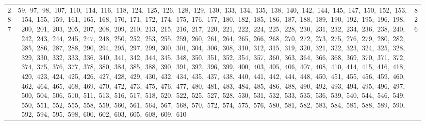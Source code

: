 \begin{longtable}{c|p{}|r}
287 & 59,\ 97,\ 98,\ 107,\ 110,\ 114,\ 116,\ 118,\ 124,\ 125,\ 126,\ 128,\ 129,\ 130,\ 133,\ 134,\ 135,\ 138,\ 140,\ 142,\ 144,\ 145,\ 147,\ 150,\ 152,\ 153,\ 154,\ 155,\ 159,\ 161,\ 165,\ 168,\ 170,\ 171,\ 172,\ 174,\ 175,\ 176,\ 177,\ 180,\ 182,\ 185,\ 186,\ 187,\ 188,\ 189,\ 190,\ 192,\ 195,\ 196,\ 198,\ 200,\ 201,\ 203,\ 205,\ 207,\ 208,\ 209,\ 210,\ 213,\ 215,\ 216,\ 217,\ 220,\ 221,\ 222,\ 224,\ 225,\ 228,\ 230,\ 231,\ 232,\ 234,\ 236,\ 238,\ 240,\ 242,\ 243,\ 244,\ 245,\ 247,\ 248,\ 250,\ 252,\ 253,\ 255,\ 259,\ 260,\ 261,\ 264,\ 265,\ 266,\ 268,\ 270,\ 272,\ 273,\ 275,\ 276,\ 279,\ 280,\ 282,\ 285,\ 286,\ 287,\ 288,\ 290,\ 294,\ 295,\ 297,\ 299,\ 300,\ 301,\ 304,\ 306,\ 308,\ 310,\ 312,\ 315,\ 319,\ 320,\ 321,\ 322,\ 323,\ 324,\ 325,\ 328,\ 329,\ 330,\ 332,\ 333,\ 336,\ 340,\ 341,\ 342,\ 344,\ 345,\ 348,\ 350,\ 351,\ 352,\ 354,\ 357,\ 360,\ 363,\ 364,\ 366,\ 368,\ 369,\ 370,\ 371,\ 372,\ 374,\ 375,\ 376,\ 377,\ 378,\ 380,\ 384,\ 385,\ 388,\ 390,\ 391,\ 392,\ 396,\ 399,\ 400,\ 403,\ 405,\ 406,\ 407,\ 408,\ 410,\ 414,\ 415,\ 416,\ 418,\ 420,\ 423,\ 424,\ 425,\ 426,\ 427,\ 428,\ 429,\ 430,\ 432,\ 434,\ 435,\ 437,\ 438,\ 440,\ 441,\ 442,\ 444,\ 448,\ 450,\ 451,\ 455,\ 456,\ 459,\ 460,\ 462,\ 464,\ 465,\ 468,\ 469,\ 470,\ 472,\ 473,\ 475,\ 476,\ 477,\ 480,\ 481,\ 483,\ 484,\ 485,\ 486,\ 488,\ 490,\ 492,\ 493,\ 494,\ 495,\ 496,\ 497,\ 500,\ 504,\ 506,\ 510,\ 511,\ 513,\ 516,\ 517,\ 518,\ 520,\ 522,\ 525,\ 527,\ 528,\ 530,\ 531,\ 532,\ 533,\ 535,\ 536,\ 539,\ 540,\ 544,\ 546,\ 549,\ 550,\ 551,\ 552,\ 555,\ 558,\ 559,\ 560,\ 561,\ 564,\ 567,\ 568,\ 570,\ 572,\ 574,\ 575,\ 576,\ 580,\ 581,\ 582,\ 583,\ 584,\ 585,\ 588,\ 589,\ 590,\ 592,\ 594,\ 595,\ 598,\ 600,\ 602,\ 603,\ 605,\ 608,\ 609,\ 610 & 826 \\

\end{longtable}

